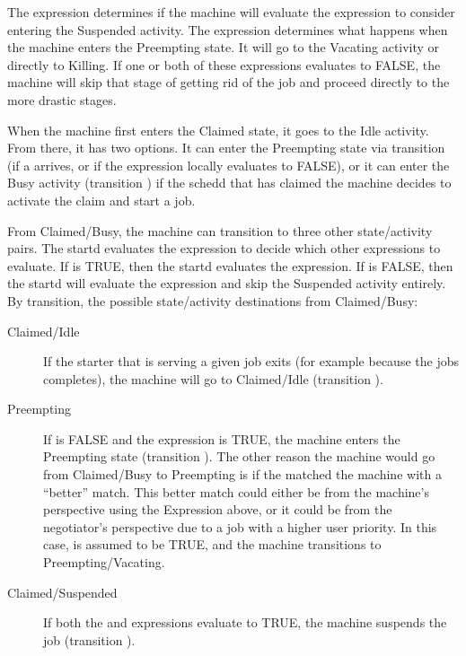 The  expression determines if the machine will
evaluate the  expression to consider entering the
Suspended activity.
The  expression determines what happens when the
machine enters the Preempting state.
It will go to the Vacating
activity or directly to Killing. 
If one or both of these expressions evaluates to FALSE, the machine
will skip that stage of getting rid of the job and proceed directly to
the more drastic stages.

When the machine first enters the Claimed state, it goes to the Idle
activity.  From there, it has two options.  
It can enter the Preempting state via transition  (if a 
 arrives, or if the  expression locally
evaluates to FALSE),  
or it can enter the Busy activity (transition ) if the
schedd that has claimed the machine decides to activate the claim and
start a job.

From Claimed/Busy, the machine can transition to three other state/activity
pairs.
The startd evaluates the  expression to decide
which other expressions to evaluate.  
If  is TRUE, then the startd evaluates the
 expression.
If  is FALSE, then the startd will
evaluate the  expression and skip the Suspended activity
entirely.
By transition, the possible state/activity destinations from Claimed/Busy:

\begin{description}
  
\item[Claimed/Idle] If the starter that is serving a given job exits
  (for example because the jobs completes), the machine will go
  to Claimed/Idle (transition ).
  
\item[Preempting] If  is FALSE and the
   expression is TRUE, the machine enters the
  Preempting state (transition ).
  The other reason the machine would go from Claimed/Busy to
  Preempting is if the  matched the machine
  with a ``better'' match.  This better match could either be from the
  machine's perspective using the  Expression above,
  or it could be from the negotiator's perspective due to
  a job with a higher user priority.
  In this case,  is assumed to be TRUE, and the
  machine transitions to Preempting/Vacating.
  
\item[Claimed/Suspended] If both the  and
   expressions evaluate to TRUE, the machine
  suspends the job (transition ).
  
\end{description}
  
